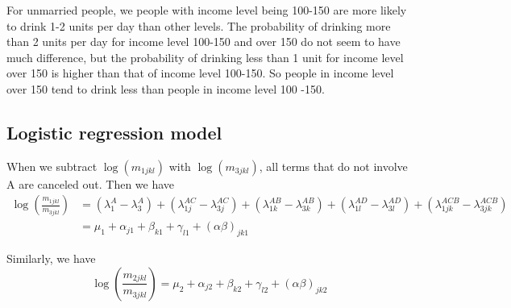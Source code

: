 \documentclass{article}
\begin{document}
        For unmarried people, we people with income level being 100-150 are more likely to drink 1-2 units per day than other levels. The probability of drinking more than 2 units per day for income level 100-150 and over 150 do not seem to have much difference, but the probability of drinking less than 1 unit for income level over 150 is higher than that of income level 100-150. So people in income level over 150 tend to drink less than people in income level 100 -150. 

	\subsection{Logistic regression model}
	When we subtract $\log(m_{1jkl})$ with $\log(m_{3jkl})$, all terms that do not involve A are canceled out. Then we have
	\begin{align*}
	\log\left(\frac{m_{1jkl}}{m_{3jkl}}\right) &= (\lambda_{1}^A - \lambda_{3}^A) + (\lambda_{1j}^{AC} - \lambda_{3j}^{AC}) + (\lambda_{1k}^{AB} - \lambda_{3k}^{AB}) + (\lambda_{1l}^{AD} - \lambda_{3l}^{AD}) + (\lambda_{1jk}^{ACB} - \lambda_{3jk}^{ACB})\\
		& = \mu_1 + \alpha_{j1} + \beta_{k1} + \gamma_{l1} + (\alpha \beta)_{jk1}
	\end{align*}

	Similarly, we have
	\[\log\left(\frac{m_{2jkl}}{m_{3jkl}}\right) = \mu_2 + \alpha_{j2} + \beta_{k2} + \gamma_{l2} + (\alpha \beta)_{jk2}\]
\end{document}
